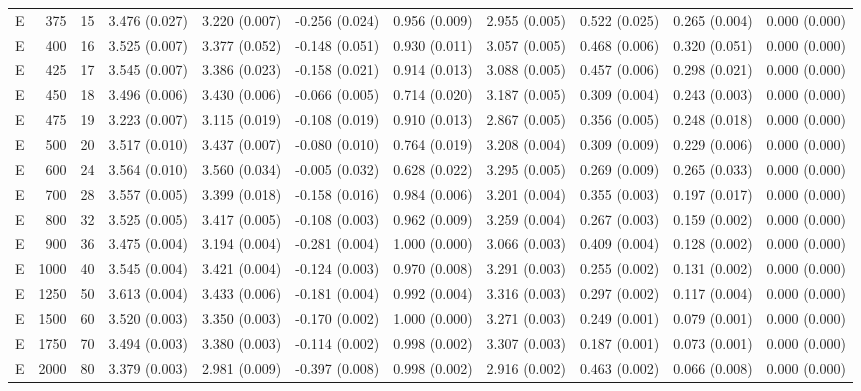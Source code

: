 \begin{tabular}{lrrllllllll}
E & 375 & 15 & 3.476 (0.027) & 3.220 (0.007) & -0.256 (0.024) & 0.956 (0.009) & 2.955 (0.005) & 0.522 (0.025) & 0.265 (0.004) & 0.000 (0.000) \\
E & 400 & 16 & 3.525 (0.007) & 3.377 (0.052) & -0.148 (0.051) & 0.930 (0.011) & 3.057 (0.005) & 0.468 (0.006) & 0.320 (0.051) & 0.000 (0.000) \\
E & 425 & 17 & 3.545 (0.007) & 3.386 (0.023) & -0.158 (0.021) & 0.914 (0.013) & 3.088 (0.005) & 0.457 (0.006) & 0.298 (0.021) & 0.000 (0.000) \\
E & 450 & 18 & 3.496 (0.006) & 3.430 (0.006) & -0.066 (0.005) & 0.714 (0.020) & 3.187 (0.005) & 0.309 (0.004) & 0.243 (0.003) & 0.000 (0.000) \\
E & 475 & 19 & 3.223 (0.007) & 3.115 (0.019) & -0.108 (0.019) & 0.910 (0.013) & 2.867 (0.005) & 0.356 (0.005) & 0.248 (0.018) & 0.000 (0.000) \\
E & 500 & 20 & 3.517 (0.010) & 3.437 (0.007) & -0.080 (0.010) & 0.764 (0.019) & 3.208 (0.004) & 0.309 (0.009) & 0.229 (0.006) & 0.000 (0.000) \\
E & 600 & 24 & 3.564 (0.010) & 3.560 (0.034) & -0.005 (0.032) & 0.628 (0.022) & 3.295 (0.005) & 0.269 (0.009) & 0.265 (0.033) & 0.000 (0.000) \\
E & 700 & 28 & 3.557 (0.005) & 3.399 (0.018) & -0.158 (0.016) & 0.984 (0.006) & 3.201 (0.004) & 0.355 (0.003) & 0.197 (0.017) & 0.000 (0.000) \\
E & 800 & 32 & 3.525 (0.005) & 3.417 (0.005) & -0.108 (0.003) & 0.962 (0.009) & 3.259 (0.004) & 0.267 (0.003) & 0.159 (0.002) & 0.000 (0.000) \\
E & 900 & 36 & 3.475 (0.004) & 3.194 (0.004) & -0.281 (0.004) & 1.000 (0.000) & 3.066 (0.003) & 0.409 (0.004) & 0.128 (0.002) & 0.000 (0.000) \\
E & 1000 & 40 & 3.545 (0.004) & 3.421 (0.004) & -0.124 (0.003) & 0.970 (0.008) & 3.291 (0.003) & 0.255 (0.002) & 0.131 (0.002) & 0.000 (0.000) \\
E & 1250 & 50 & 3.613 (0.004) & 3.433 (0.006) & -0.181 (0.004) & 0.992 (0.004) & 3.316 (0.003) & 0.297 (0.002) & 0.117 (0.004) & 0.000 (0.000) \\
E & 1500 & 60 & 3.520 (0.003) & 3.350 (0.003) & -0.170 (0.002) & 1.000 (0.000) & 3.271 (0.003) & 0.249 (0.001) & 0.079 (0.001) & 0.000 (0.000) \\
E & 1750 & 70 & 3.494 (0.003) & 3.380 (0.003) & -0.114 (0.002) & 0.998 (0.002) & 3.307 (0.003) & 0.187 (0.001) & 0.073 (0.001) & 0.000 (0.000) \\
E & 2000 & 80 & 3.379 (0.003) & 2.981 (0.009) & -0.397 (0.008) & 0.998 (0.002) & 2.916 (0.002) & 0.463 (0.002) & 0.066 (0.008) & 0.000 (0.000) \\

\end{tabular}
